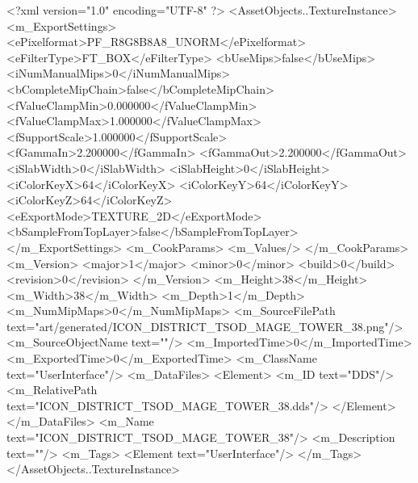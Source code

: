 <?xml version="1.0" encoding="UTF-8" ?>
<AssetObjects..TextureInstance>
	<m_ExportSettings>
		<ePixelformat>PF_R8G8B8A8_UNORM</ePixelformat>
		<eFilterType>FT_BOX</eFilterType>
		<bUseMips>false</bUseMips>
		<iNumManualMips>0</iNumManualMips>
		<bCompleteMipChain>false</bCompleteMipChain>
		<fValueClampMin>0.000000</fValueClampMin>
		<fValueClampMax>1.000000</fValueClampMax>
		<fSupportScale>1.000000</fSupportScale>
		<fGammaIn>2.200000</fGammaIn>
		<fGammaOut>2.200000</fGammaOut>
		<iSlabWidth>0</iSlabWidth>
		<iSlabHeight>0</iSlabHeight>
		<iColorKeyX>64</iColorKeyX>
		<iColorKeyY>64</iColorKeyY>
		<iColorKeyZ>64</iColorKeyZ>
		<eExportMode>TEXTURE_2D</eExportMode>
		<bSampleFromTopLayer>false</bSampleFromTopLayer>
	</m_ExportSettings>
	<m_CookParams>
		<m_Values/>
	</m_CookParams>
	<m_Version>
		<major>1</major>
		<minor>0</minor>
		<build>0</build>
		<revision>0</revision>
	</m_Version>
	<m_Height>38</m_Height>
	<m_Width>38</m_Width>
	<m_Depth>1</m_Depth>
	<m_NumMipMaps>0</m_NumMipMaps>
	<m_SourceFilePath text="art/generated/ICON_DISTRICT_TSOD_MAGE_TOWER_38.png"/>
	<m_SourceObjectName text=""/>
	<m_ImportedTime>0</m_ImportedTime>
	<m_ExportedTime>0</m_ExportedTime>
	<m_ClassName text="UserInterface"/>
	<m_DataFiles>
		<Element>
			<m_ID text="DDS"/>
			<m_RelativePath text="ICON_DISTRICT_TSOD_MAGE_TOWER_38.dds"/>
		</Element>
	</m_DataFiles>
	<m_Name text="ICON_DISTRICT_TSOD_MAGE_TOWER_38"/>
	<m_Description text=""/>
	<m_Tags>
		<Element text="UserInterface"/>
	</m_Tags>
</AssetObjects..TextureInstance>

